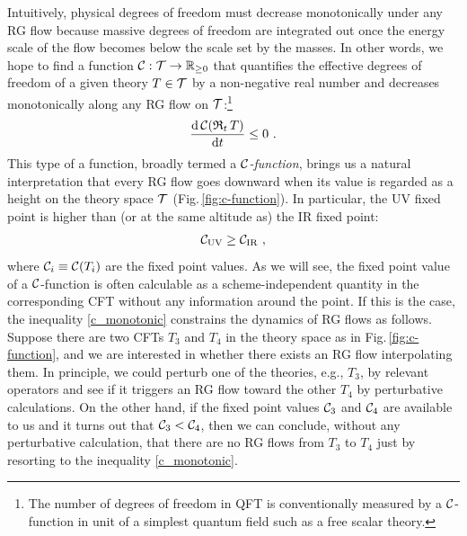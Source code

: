 Intuitively, physical degrees of freedom must decrease monotonically under any RG flow because massive degrees of freedom are integrated out once the energy scale of the flow becomes below the scale set by the masses.
In other words, we hope to find a function ${\cal C}: {\cal T} \to \mathbb{R}_{\ge 0}$ that quantifies the effective degrees of freedom of a given theory $T\in {\cal T}$ by a non-negative real number and decreases monotonically along any RG flow on ${\cal T}$:\footnote{The number of degrees of freedom in QFT is conventionally measured by a ${\cal C}$-function in unit of a simplest quantum field such as a free scalar theory.}
\begin{align}\label{c_monotonic_decreasing}
	\frac{\mathrm{d}\, {\cal C} (\mathfrak{R}_t\, T)}{\mathrm{d} t} \le 0 \ .
\end{align}
This type of a function, broadly termed a \emph{${\cal C}$-function}, brings us a natural interpretation that every RG flow goes downward when its value is regarded as a height on the theory space ${\cal T}$ (Fig.\,\ref{fig:c-function}).
In particular, the UV fixed point is higher than (or at the same altitude as) the IR fixed point:
\begin{align}\label{c_monotonic}
	{\cal C}_\text{UV} \ge {\cal C}_\text{IR} \ ,
\end{align}
where ${\cal C}_i \equiv {\cal C} (T_i)$ are the fixed point values.
As we will see, the fixed point value of a ${\cal C}$-function is often calculable as a scheme-independent quantity in the corresponding CFT without any information around the point.
If this is the case, the inequality \eqref{c_monotonic} constrains the dynamics of RG flows as follows.
Suppose there are two CFTs $T_3$ and $T_4$ in the theory space as in Fig.\,\ref{fig:c-function}, and we are interested in whether there exists an RG flow interpolating them.
In principle, we could perturb one of the theories, e.g., $T_3$, by relevant operators and see if it triggers an RG flow toward the other $T_4$ by perturbative calculations.
On the other hand, if the fixed point values ${\cal C}_3$ and ${\cal C}_4$ are available to us and it turns out that ${\cal C}_3 < {\cal C}_4$, then we can conclude, without any perturbative calculation, that there are no RG flows from $T_3$ to $T_4$ just by resorting to the inequality \eqref{c_monotonic}.

